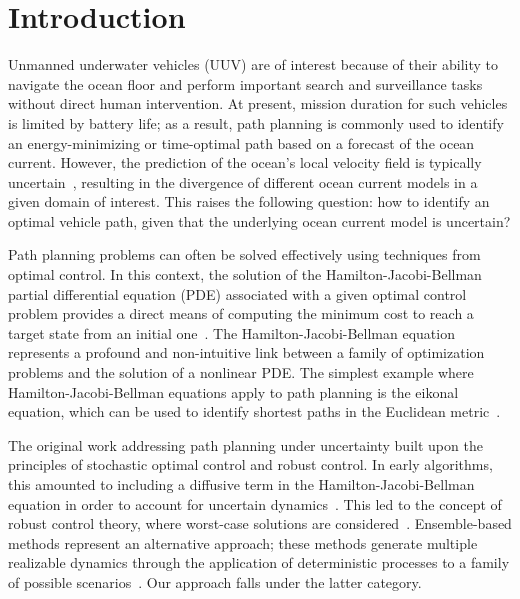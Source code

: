 \documentclass[pdflatex,sn-mathphys-num]{sn-jnl}%
\theoremstyle{thmstyleone}%
\theoremstyle{thmstyletwo}%
\theoremstyle{thmstylethree}%
\begin{document}



\maketitle

\section{Introduction}

Unmanned underwater vehicles (UUV) are of interest because of their ability to navigate the ocean floor and perform important search and surveillance tasks without direct human intervention.  At present, mission duration for such vehicles is limited by battery life; as a result, path planning is commonly used to identify an energy-minimizing or time-optimal path based on a forecast of the ocean current.  However, the prediction of the ocean's local velocity field is typically uncertain~\cite{Lermusiaux2006}, resulting in the divergence of different ocean current models in a given domain of interest.  This raises the following question: how to identify an optimal vehicle path, given that the underlying ocean current model is uncertain?


Path planning problems can often be solved effectively using techniques from optimal control.  In this context, the solution of the Hamilton-Jacobi-Bellman partial differential equation (PDE) associated with a given optimal control problem provides a direct means of computing the minimum cost to reach a target state from an initial one~\cite{Bellman1957, Fleming2006}.  The Hamilton-Jacobi-Bellman equation represents a profound and non-intuitive link between a family of optimization problems and the solution of a nonlinear PDE.   The simplest example where Hamilton-Jacobi-Bellman equations apply to path planning is the eikonal equation, which can be used to identify shortest paths in the Euclidean metric~\cite{Sethian1999, Tsitsiklis1995}.  

The original work addressing path planning under uncertainty built upon the principles of stochastic optimal control and robust control.  In early algorithms, this amounted to including a diffusive term in the Hamilton-Jacobi-Bellman equation in order to account for uncertain dynamics~\cite{Isaacs1965}.  This led to the concept of robust control theory, where worst-case solutions are considered~\cite{Basar1995}.  Ensemble-based methods represent an alternative approach; these methods generate multiple realizable dynamics through the application of deterministic processes to a family of possible scenarios~\cite{Evensen2003, Calafiore2006, Mesbah2016}.  Our approach falls under the latter category. 
\end{document}
